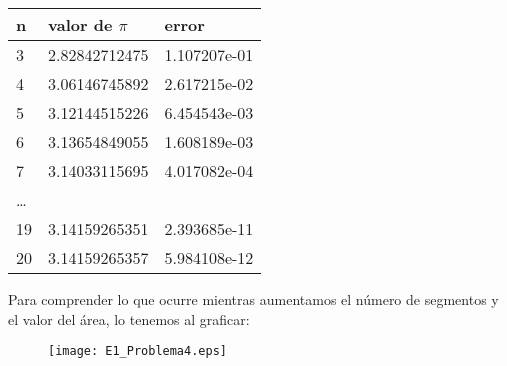 \begin{frame}
\begin{center}
	\begin{tabular}{l | l | l}
	n & valor de $\pi$ & error \\ \hline
	3 & 2.82842712475 & 1.107207e-01 \\ \hline
	4 & 3.06146745892 & 2.617215e-02 \\ \hline
	5 & 3.12144515226 & 6.454543e-03 \\ \hline
	6 & 3.13654849055 & 1.608189e-03 \\ \hline
	7 & 3.14033115695 & 4.017082e-04 \\ \hline
	\ldots & & \\ \hline
	19 & 3.14159265351 & 2.393685e-11 \\ \hline
	20 & 3.14159265357 & 5.984108e-12 \\ \hline
	\end{tabular}
\end{center}
\end{frame}
\begin{frame}
Para comprender lo que ocurre mientras aumentamos el n\'{u}mero de segmentos y el valor del \'{a}rea, lo tenemos al graficar:
\begin{figure}
	\centering
	\texttt{[image: E1\_Problema4.eps]} 
\end{figure}
\end{frame}
